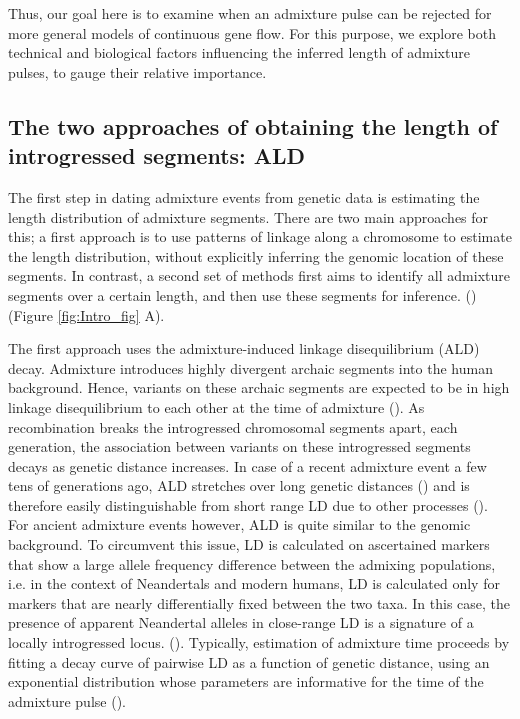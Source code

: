 \documentclass[]{article}
\begin{document}
Thus, our goal here is to examine when an admixture pulse can be rejected for more general models of continuous gene flow.  For this purpose, we explore both technical and biological factors influencing the inferred length of admixture pulses, to gauge their relative importance.

\subsection{The two approaches of obtaining the length of introgressed
segments:
ALD}\label{the-two-approaches-of-obtaining-the-length-of-introgressed-segments-ald}

The first step in dating admixture events from genetic data is estimating the length distribution of admixture segments.  There are two main approaches for this; a first approach is to use patterns of linkage along a chromosome to estimate the length distribution, without explicitly inferring the genomic location of these segments. In contrast, a second set of methods first aims to identify all admixture segments over a certain length, and then use these segments for inference. 
(\cite{chimusa_dating_2018}) (Figure \ref{fig:Intro_fig} A).

The first approach uses the admixture-induced linkage disequilibrium
(ALD) decay. Admixture introduces highly divergent archaic segments into
the human background. Hence, variants on these archaic segments are
expected to be in high linkage disequilibrium to each other at the time
of admixture
(\cite{chakraborty_admixture_1988,stephens_mapping_1994,wall_detecting_2000}).
As recombination breaks the introgressed chromosomal segments apart, each
generation, the association between variants on these introgressed
segments decays as genetic distance increases. In case of a recent
admixture event a few tens of generations ago, ALD stretches  over long genetic distances
(\cite{patterson_methods_2004}) and is therefore easily distinguishable
from short range LD due to other processes (\cite{moorjani_history_2011}). For ancient
admixture events however, ALD is quite similar to the genomic background. To circumvent this issue, LD is calculated on ascertained markers that show a large allele frequency difference between the admixing populations, i.e. in the context of Neandertals and modern humans, LD is calculated only for markers that are nearly differentially fixed between the two taxa. In this case, the presence of apparent Neandertal alleles in close-range LD is a signature of a locally introgressed locus.
(\cite{sankararaman_date_2012}). Typically, estimation of admixture time proceeds by fitting a decay curve of pairwise LD as a function of
genetic distance, using an exponential distribution whose parameters are informative for the time of the admixture pulse
(\cite{moorjani_history_2011,loh_inferring_2013}).
\end{document}
